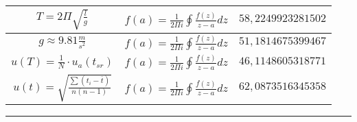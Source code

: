 \documentclass{article}
\begin{document}
\begin{flushleft}
\begin{longtable}{|c|c|c|}
$T=2\Pi \sqrt{\frac{l}{g}}$ & $f\left(a\right)=\frac{1}{2\Pi i}\oint\frac{f\left(z\right)}{z-a}dz$ & $58,2249923281502$ \\ \hline 
$g\approx9.81\frac{m}{s^2}$ & $f\left(a\right)=\frac{1}{2\Pi i}\oint\frac{f\left(z\right)}{z-a}dz$ & $51,1814675399467$ \\ \hline 
$u(T)=\frac{1}{N}\cdot u_a(t_{sr})$ & $f\left(a\right)=\frac{1}{2\Pi i}\oint\frac{f\left(z\right)}{z-a}dz$ & $46,1148605318771$ \\ \hline 
$u(t)=\sqrt{\frac{\sum(t_i-\overline{t})}{n(n-1)}}$ & $f\left(a\right)=\frac{1}{2\Pi i}\oint\frac{f\left(z\right)}{z-a}dz$ & $62,0873516345358$ \\ \hline 
\end{longtable} 

\end{flushleft}
\hrule
\end{document}
